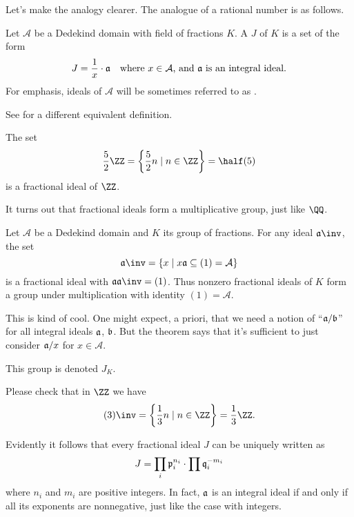 Let's make the analogy clearer.
The analogue of a rational number is as follows.

\begin{definition}
	Let $\mathcal A$ be a Dedekind domain with field of fractions $K$.
	A  $J$ of $K$ is a set of the form 
	\[ J = \frac{1}{x} \cdot \aa \quad \text{where $x \in \mathcal A$, and $\aa$ is an integral ideal.} \]
	For emphasis, ideals of $\mathcal A$ will be sometimes referred to as .
\end{definition}
See  for a different equivalent definition.

\begin{example}
	The set \[ \frac52 \ZZ = \left\{ \frac52n \mid n \in \ZZ \right\} = \half (5) \]
	is a fractional ideal of $\ZZ$.
\end{example}

It turns out that fractional ideals form a multiplicative group,
just like $\QQ$.
\begin{theorem}
	Let $\mathcal A$ be a Dedekind domain and $K$ its group of fractions.
	For any ideal $\aa\inv$, the set
	\[ \aa\inv = \left\{ x \mid x\aa \subseteq (1) = \mathcal A  \right\} \]
	is a fractional ideal with $\aa \aa\inv = (1)$.
	Thus nonzero fractional ideals of $K$ form a group under multiplication
	with identity $(1) = \mathcal A$.
\end{theorem}
This is kind of cool.
One might expect, a priori, that we need a notion of ``$\aa / \bb$'' for all integral ideals $\aa$, $\bb$.
But the theorem says that it's sufficient to just consider  $\aa / x$ for $x \in \mathcal A$.
\begin{definition}
	This group is denoted $J_K$.
\end{definition}

\begin{example}[$(3)\inv$ in $\ZZ$]
	Please check that in $\ZZ$ we have
	\[ (3)\inv = \left\{ \frac 13 n \mid n \in \ZZ \right\} = \frac 13 \ZZ. \]
\end{example}

Evidently it follows that every fractional ideal $J$ can be uniquely written as
\[ J = \prod_i \pp_i^{n_i} \cdot \prod \qq_i^{-m_i} \]
where $n_i$ and $m_i$ are positive integers.
In fact, $\aa$ is an integral ideal if and only if all its exponents are nonnegative,
just like the case with integers.

